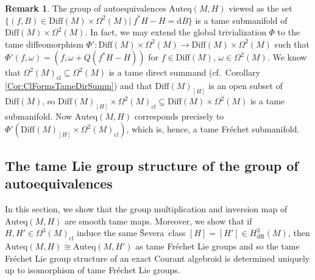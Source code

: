 \documentclass[12pt,a4paper]{article}
\theoremstyle{plain}
\theoremstyle{definition}
\newtheorem{remark}[theorem]{Remark}
\newcommand{\om}{\omega}
\newcommand{\Forms}[1]{\Omega^{#1}(M)}
\newcommand{\ClForms}[1]{\Forms{#1}_{\mathrm{cl}}}
\newcommand{\Diff}{\mathrm{Diff}(M)}
\newcommand{\SDiff}{\mathrm{Diff}(M)_{[H]}}
\newcommand{\Auteq}{\mathrm{Auteq}(M,H)}
\newcommand{\Severa}{\v{S}evera}
\renewcommand{\d}{\mathrm{d}}
\begin{document}
\begin{remark}
The group of autoequivalences $\Auteq$ viewed as the set 
$\{(f,B)\in\Diff\times \Forms{2}|~f^*H-H=\d B \}$ is a tame submanifold of $\Diff\times \Forms{2}$.
In fact, we may extend the global trivialization $\Phi$ to the tame diffeomorphism
$\Phi':\Diff\times \Forms{2}\to \Diff\times \Forms{2}$ such that $\Phi'(f,\om)=(f,\om + Q(f^*H-H))$ for $f\in \Diff$, $\om \in \Forms{2}$. We know that $\ClForms{2}\subseteq \Forms{2}$ is a tame direct summand (cf.~Corollary \ref{Cor:ClFormsTameDirSumm}) and that $\SDiff$ is an open subset of $\Diff$, so $\SDiff\times \ClForms{2}\subseteq \Diff\times \Forms{2}$ is a tame submanifold. Now $\Auteq$ corresponds precisely to
$\Phi'(\SDiff\times \ClForms{2})$, which is, hence, a tame Fréchet submanifold. 
\end{remark}





\subsection{The tame Lie group structure of the group of autoequivalences}
\label{SubSect:LieGrStrOfAuteq}

In this section, we show that the group multiplication and inversion map of $\Auteq$ are smooth tame maps. Moreover, we show that if $H,H'\in \ClForms{3}$ induce the same \Severa\ class $[H]=[H']\in H^3_{\mathrm{dR}}(M)$, then $\Auteq \cong  \mathrm{Auteq}(M,H')$ as tame Fréchet Lie groups and so the tame Fréchet Lie group structure of an exact Courant algebroid is determined uniquely up to isomorphism of tame Fréchet Lie groups.\\
\end{document}
